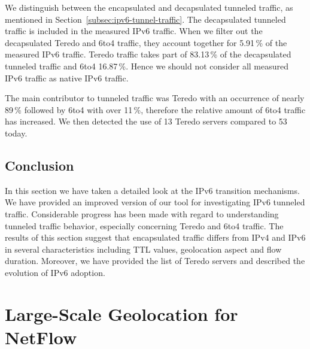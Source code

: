 We distinguish between the encapsulated and decapsulated tunneled traffic, as mentioned in Section~\ref{subsec:ipv6-tunnel-traffic}. The decapsulated tunneled traffic is included in the measured IPv6 traffic. When we filter out the decapsulated Teredo and 6to4 traffic, they account together for 5.91\,\% of the measured IPv6 traffic. Teredo traffic takes part of 83.13\,\% of the decapsulated tunneled traffic and 6to4 16.87\,\%. Hence we should not consider all measured IPv6 traffic as native IPv6 traffic.

The main contributor to tunneled traffic was Teredo with an occurrence of nearly 89\,\% followed by 6to4 with over 11\,\%, therefore the relative amount of 6to4 traffic has increased. We then detected the use of 13 Teredo servers compared to 53 today. %

\subsection{Conclusion} \label{subsec:ipv6-tunnels-conclusion}

In this section we have taken a detailed look at the IPv6 transition mechanisms. We have provided an improved version of our tool for investigating IPv6 tunneled traffic. Considerable progress has been made with regard to understanding tunneled traffic behavior, especially concerning Teredo and 6to4 traffic. The results of this section suggest that encapsulated traffic differs from IPv4 and IPv6 in several characteristics including TTL values, geolocation aspect and flow duration. Moreover, we have provided the list of Teredo servers and described the evolution of IPv6 adoption.



\section{Large-Scale Geolocation for NetFlow}\label{sec:analysis-geolocation}

